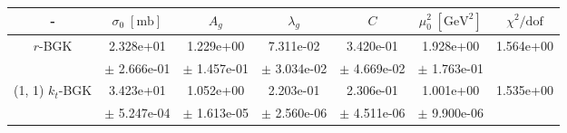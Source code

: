 \begin{tabular}{|c|c|c|c|c|c|c|}
\hline - & $\sigma_0 \; [\mathrm{mb}]$ & $A_g$ & $\lambda_g$ & $C$ & $\mu_0^2 \;\left[\mathrm{GeV^2}\right]$ & $\chi^2/\mathrm{dof}$ \\\hline 
{\footnotesize $r$-BGK} & 2.328e+01& 1.229e+00& 7.311e-02& 3.420e-01& 1.928e+00& 1.564e+00\\
&\hfill {\tiny $\pm$ 2.666e-01}&\hfill {\tiny $\pm$ 1.457e-01}&\hfill {\tiny $\pm$ 3.034e-02}&\hfill {\tiny $\pm$ 4.669e-02}&\hfill {\tiny $\pm$ 1.763e-01}& \\\hline 
\color{gray} (1, 1) {\footnotesize $k_t$-BGK} & 3.423e+01& 1.052e+00& 2.203e-01& 2.306e-01& 1.001e+00& 1.535e+00\\
&\hfill {\tiny $\pm$ 5.247e-04}&\hfill {\tiny $\pm$ 1.613e-05}&\hfill {\tiny $\pm$ 2.560e-06}&\hfill {\tiny $\pm$ 4.511e-06}&\hfill {\tiny $\pm$ 9.900e-06}& \\\hline 
\end{tabular}